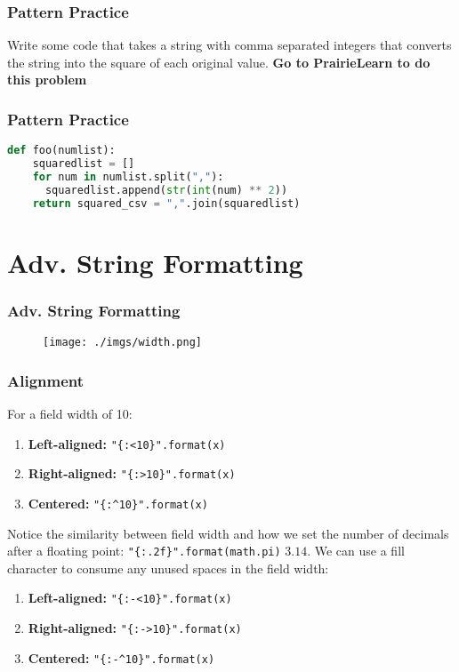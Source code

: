 \documentclass{beamer}
\begin{document}
%
%
\begin{frame}[fragile]
  \frametitle{Pattern Practice}
  Write some code that takes a string with comma separated integers
  that converts the string into the square of each original value.
  \vfill
  \textbf{Go to PrairieLearn to do this problem}
\end{frame}

%
%
\begin{frame}[fragile]
  \frametitle{Pattern Practice}
  \begin{lstlisting}[language=Python, autogobble]
  def foo(numlist):
    squaredlist = []
    for num in numlist.split(","):
      squaredlist.append(str(int(num) ** 2))
    return squared_csv = ",".join(squaredlist)
  \end{lstlisting}
\end{frame}

\section{Adv. String Formatting}

%
%
\begin{frame}[fragile]
  \frametitle{Adv. String Formatting}
	\begin{figure}
		\texttt{[image: ./imgs/width.png]}
	\end{figure}
\end{frame}

%
%
\begin{frame}[fragile]
  \frametitle{Alignment}
  For a field width of 10:
  \begin{enumerate}
    \item \textbf{Left-aligned: } \lstinline|"{:<10}".format(x)|
    \item \textbf{Right-aligned: } \lstinline|"{:>10}".format(x)|
    \item \textbf{Centered: } \lstinline|"{:^10}".format(x)|
  \end{enumerate}
  \vfill
  Notice the similarity between field width and how we set the number of decimals after a floating point: \lstinline|"{:.2f}".format(math.pi)| \textrightarrow $3.14$.
  \pause
  \vfill
  We can use a fill character to consume any unused spaces in the field width:
  \begin{enumerate}
    \item \textbf{Left-aligned: } \lstinline|"{:-<10}".format(x)|
    \item \textbf{Right-aligned: } \lstinline|"{:->10}".format(x)|
    \item \textbf{Centered: } \lstinline|"{:-^10}".format(x)|
  \end{enumerate}
\end{frame}
\end{document}
